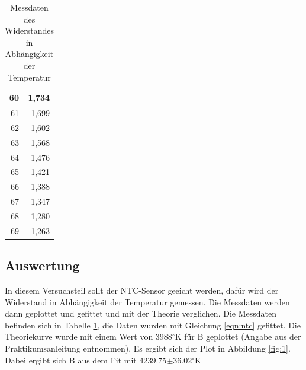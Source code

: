 \documentclass[12pt,a4paper]{article}
\begin{document}
\begin{table}[htbp]
\begin{center}
\begin{tabular}{|r|r|}
60 & 1,734 \\ \hline
61 & 1,699 \\ \hline
62 & 1,602 \\ \hline
63 & 1,568 \\ \hline
64 & 1,476 \\ \hline
65 & 1,421 \\ \hline
66 & 1,388 \\ \hline
67 & 1,347 \\ \hline
68 & 1,280 \\ \hline
69 & 1,263 \\ \hline
\end{tabular}
\end{center}
\caption{Messdaten des Widerstandes in Abhängigkeit der Temperatur}
\label{tab:1}
\end{table}


\subsection{Auswertung}

In diesem Versuchsteil sollt der NTC-Sensor geeicht werden, dafür wird der Widerstand in Abhängigkeit der Temperatur gemessen. Die Messdaten werden dann geplottet und gefittet und mit der Theorie verglichen. Die Messdaten befinden sich in Tabelle \ref{tab:1}, die Daten wurden mit Gleichung \ref{eqn:ntc} gefittet. Die Theoriekurve wurde mit einem Wert von 3988$^\circ$K für B geplottet (Angabe aus der Praktikumsanleitung entnommen). Es ergibt sich der Plot in Abbildung \ref{fig:1}. Dabei ergibt sich B aus dem Fit mit 4239.75$\pm$36.02$^\circ$K
\end{document}
